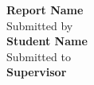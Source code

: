 \begin{titlepage}


    
\begin{center}



\Large \textbf {Report Name}\\[0.7in]


       

\normalsize Submitted by \\[0.2in]
\textbf{Student Name}\\


\vspace{2cm}
\normalsize Submitted to \\[0.2in]
\textbf{Supervisor}\\





\end{center}

\end{titlepage}
